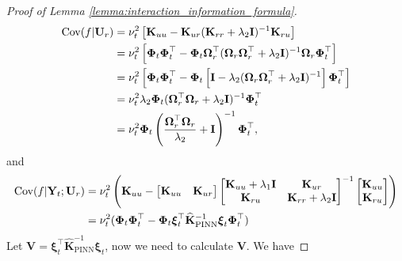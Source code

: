 \begin{proof}[Proof of Lemma \ref{lemma:interaction_information_formula}]
\begin{align}
    \textup{Cov}(f \rvert \mathbf{U}_r) &=  \nu_t^2 \left[ \mathbf{K}_{uu} - \mathbf{K}_{ur}(\mathbf{K}_{rr}+ \lambda_2\mathbf{I})^{-1} \mathbf{K}_{ru} \right] \nonumber
        \\
        &= \nu_t^2 \left[\boldsymbol{\Phi}_t \boldsymbol{\Phi}_t^\top - \boldsymbol{\Phi}_t\boldsymbol{\Omega}_r^\top (\boldsymbol{\Omega}_r\boldsymbol{\Omega}_r^\top + \lambda_2\mathbf{I})^{-1} \boldsymbol{\Omega}_r\boldsymbol{\Phi}_t^\top \right] \nonumber
        \\
        &= \nu_t^2 \left[\boldsymbol{\Phi}_t\boldsymbol{\Phi}_t^\top - \boldsymbol{\Phi}_t\left[\mathbf{I} - \lambda_2(\boldsymbol{\Omega}_r\boldsymbol{\Omega}_r^\top + \lambda_2\mathbf{I})^{-1}\right] \boldsymbol{\Phi}_t^\top \right] \nonumber
        \\
        &= \nu_t^2 \lambda_2 \boldsymbol{\Phi}_t (\boldsymbol{\Omega}_r^\top \boldsymbol{\Omega}_r + \lambda_2\mathbf{I})^{-1} \boldsymbol{\Phi}_t^\top \nonumber 
        \\ 
        &= \nu_t^2 \boldsymbol{\Phi}_t \left(\frac{\boldsymbol{\Omega}_r^\top \boldsymbol{\Omega}_r}{\lambda_2} + \mathbf{I}\right)^{-1} \boldsymbol{\Phi}_t^\top, \label{Eqn:covar_f_condition_on_u}  
\end{align}
and 
\begin{align}
        \textup{Cov}(f \rvert \mathbf{Y}_t; \mathbf{U}_r) &= \nu_t^2 \left(\mathbf{K}_{uu} - \begin{bmatrix}
            \mathbf{K}_{uu} & \mathbf{K}_{ur}
        \end{bmatrix} \begin{bmatrix}
            \mathbf{K}_{uu} + \lambda_1\mathbf{I} & \mathbf{K}_{ur} \\
            \mathbf{K}_{ru} & \mathbf{K}_{rr} + \lambda_2 \mathbf{I}
        \end{bmatrix}^{-1} \begin{bmatrix}
            \mathbf{K}_{uu} \\
            \mathbf{K}_{ru}
        \end{bmatrix} \right)  \nonumber
        \\
        & = \nu_t^2 (\boldsymbol{\Phi}_t \boldsymbol{\Phi}_t^\top - \boldsymbol{\Phi}_t \boldsymbol{\xi}_t^\top \mathbf{\widehat{K}}_\mathrm{PINN}^{-1} \boldsymbol{\xi}_t \boldsymbol{\Phi}_t^\top)  \label{Eqn:covar_f_condition_on_y_and_u}
\end{align}
Let $\mathbf{V} = \boldsymbol{\xi}_t^\top \mathbf{\widehat{K}}_\mathrm{PINN}^{-1} \boldsymbol{\xi}_t$, now we need to calculate $\mathbf{V}$. We have

\end{proof}
